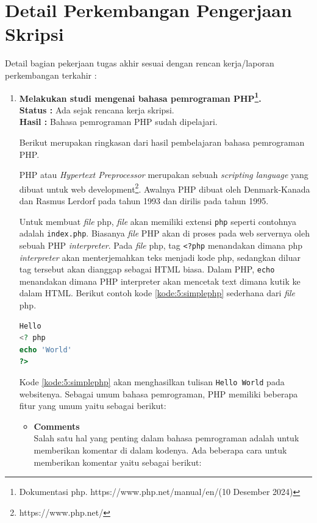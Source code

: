 \documentclass[a4paper,twoside]{article}
\begin{document}
\section{Detail Perkembangan Pengerjaan Skripsi}
Detail bagian pekerjaan tugas akhir sesuai dengan rencan kerja/laporan perkembangan terkahir :
\begin{enumerate}
	\item \textbf{Melakukan studi mengenai bahasa pemrograman PHP\footnote{Dokumentasi php. https://www.php.net/manual/en/(10 Desember 2024)}.}\\
	      {\bf Status :} Ada sejak rencana kerja skripsi.\\
	      {\bf Hasil :} Bahasa pemrograman PHP sudah dipelajari.

	      Berikut merupakan ringkasan dari hasil pembelajaran bahasa pemrograman PHP.

	      PHP atau \textit{Hypertext Preprocessor} merupakan sebuah \textit{scripting language} yang dibuat untuk web development\footnote{https://www.php.net/}. Awalnya PHP dibuat oleh Denmark-Kanada dan Rasmus Lerdorf pada tahun 1993 dan dirilis pada tahun 1995.

	      Untuk membuat \textit{file} php, \textit{file} akan memiliki extensi \verb|php| seperti contohnya adalah \verb|index.php|. Biasanya \textit{file} PHP akan di proses pada web servernya oleh sebuah PHP \textit{interpreter}. Pada \textit{file} php, tag \verb|<?php| menandakan dimana php \textit{interpreter} akan menterjemahkan teks menjadi kode php, sedangkan diluar tag tersebut akan dianggap sebagai HTML biasa. Dalam PHP, \verb|echo| menandakan dimana PHP interpreter akan mencetak text dimana kutik ke dalam HTML. Berikut contoh kode \ref{kode:5:simplephp} sederhana dari \textit{file} php.

	      \begin{lstlisting}[language={php}, caption={Contoh Sederhana \textit{File} PHP}, label={kode:5:simplephp}]
Hello 
<? php
echo 'World'
?>
		  \end{lstlisting}

	      Kode \ref{kode:5:simplephp} akan menghasilkan tulisan \verb|Hello World| pada websitenya. Sebagai umum bahasa pemrograman, PHP memiliki beberapa fitur yang umum yaitu sebagai berikut:

	      \begin{itemize}
		      \item \textbf{Comments} \\
		            Salah satu hal yang penting dalam bahasa pemrograman adalah untuk memberikan komentar di dalam kodenya. Ada beberapa cara untuk memberikan komentar yaitu sebagai berikut:


\end{itemize}
\end{enumerate}
\end{document}
